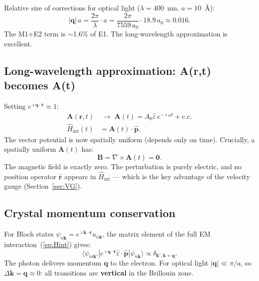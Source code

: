 \documentclass[11pt]{article}
\newcommand{\iunit}{\imath}
\newcommand{\Avec}{\mathbf{A}}
\newcommand{\Bvec}{\mathbf{B}}
\newcommand{\phat}{\hat{\mathbf{p}}}
\newcommand{\rhat}{\hat{\mathbf{r}}}
\begin{document}
\noindent Relative size of corrections for optical light
($\lambda=400$~nm, $a=10$~\AA):
\begin{equation}
  |\mathbf{q}|\,a
  = \frac{2\pi}{\lambda}\cdot a
  = \frac{2\pi}{7559\,a_0}\cdot18.9\,a_0
  \approx 0.016.
\end{equation}
The M1+E2 term is $\sim$1.6\% of E1.
The long-wavelength approximation is excellent.

\subsection{Long-wavelength approximation: A(r,t) becomes A(t)}

Setting $e^{\iunit\mathbf{q}\cdot\mathbf{r}}\approx1$:
\begin{align}
  \Avec(\mathbf{r},t)&\;\longrightarrow\;\Avec(t)
  = A_0\hat{\varepsilon}\,e^{-\iunit\omega t}+\text{c.c.}
  \label{eq:A-uniform}
  \\
  \hat{H}_\mathrm{int}(t) &= \Avec(t)\cdot\phat.
  \label{eq:Hint-LWA}
\end{align}
The vector potential is now spatially uniform (depends only on
time).
Crucially, a spatially uniform $\Avec(t)$ has:
\begin{equation}
  \Bvec = \nabla\times\Avec(t) = \mathbf{0}.
\end{equation}
The magnetic field is exactly zero.
The perturbation is purely electric, and no position operator
$\rhat$ appears in $\hat{H}_\mathrm{int}$ --- which is the key
advantage of the velocity gauge (Section~\ref{sec:VG}).

\subsection{Crystal momentum conservation}

For Bloch states $\psi_{n\mathbf{k}}
= e^{\iunit\mathbf{k}\cdot\mathbf{r}}u_{n\mathbf{k}}$,
the matrix element of the full EM interaction~(\ref{eq:Hint})
gives:
\begin{equation}
  \langle\psi_{m\mathbf{k}'}|
  e^{\iunit\mathbf{q}\cdot\mathbf{r}}\hat{\varepsilon}\cdot\phat
  |\psi_{n\mathbf{k}}\rangle
  \propto \delta_{\mathbf{k}',\mathbf{k}+\mathbf{q}}.
  \label{eq:k-cons}
\end{equation}
The photon delivers momentum $\mathbf{q}$ to the electron.
For optical light $|\mathbf{q}|\ll\pi/a$, so
$\Delta\mathbf{k}=\mathbf{q}\approx0$: all transitions are
\textbf{vertical} in the Brillouin zone.
\end{document}
